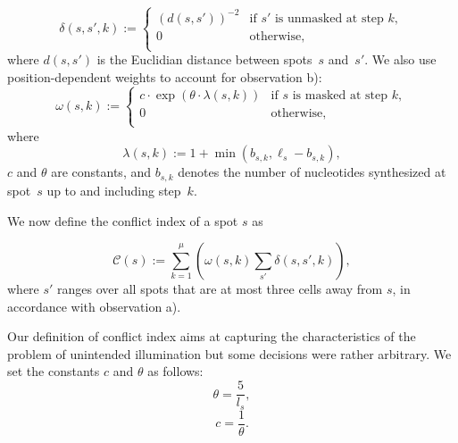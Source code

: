 \documentclass{bioinfo}
\begin{document}
\begin{equation}
\label{eq:dist_weight}
\delta(s,s',k) :=
        \left\{
                \begin{array}{ll}
                        (d(s,s'))^{-2} & \mbox{if $s'$ is unmasked at step $k$}, \\
                        0 & \mbox{otherwise}, \\
                \end{array}
        \right.
\end{equation}
where $d(s,s')$ is the Euclidian distance between spots~$s$ and~$s'$. We also use position-dependent weights to account for observation b):
\begin{equation}
\label{eq:pos_mult}
\omega(s,k) :=
        \left\{
                \begin{array}{ll}
                        c \cdot \exp{\left(\theta \cdot \lambda(s,k)\right)} & \mbox{if $s$ is masked at step $k$}, \\
                        0 & \mbox{otherwise}, \\
                \end{array}
        \right.
\end{equation}
where
\begin{equation}
\label{eq:base_pos}
\lambda(s,k) := 1 + \min(b_{s,k},\ell_{s} - b_{s,k}),
\end{equation}
$c$ and $\theta$ are constants, and $b_{s,k}$ denotes the number of nucleotides synthesized at spot~$s$ up to and including step~$k$.

We now define the conflict index of a spot $s$ as

\begin{equation}
\label{eq:conf_idx}
\mathcal{C}(s) := \sum_{k=1}^{\mu} \left( \omega(s,k) \sum_{s'} \delta(s,s',k) \right),
\end{equation}
where $s'$ ranges over all spots that are at most three cells away from $s$, in accordance with observation a).

Our definition of conflict index aims at capturing the characteristics of the problem of unintended illumination but some decisions were rather arbitrary. We set the constants $c$ and $\theta$ as follows:
\begin{displaymath}
\theta = \frac{5}{l_s},
\end{displaymath}
\begin{displaymath}
c = \frac{1}{\theta}.
\end{displaymath}
\end{document}
